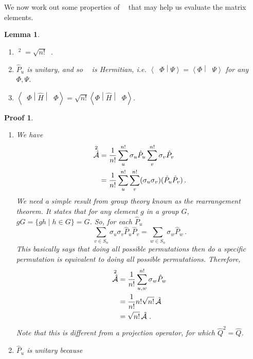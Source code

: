 \documentclass{article}
\theoremstyle{plain}\theoremheaderfont{\normalfont\itshape}\theorembodyfont{\rmfamily}\theoremseparator{.}\newtheorem*{rem}{Remark}\newtheorem*{ex}{Example}\newtheorem*{proof}{Proof}\newtheorem*{altp}{Alternative proof}
\theoremstyle{plain}\theoremheaderfont{\normalfont\bfseries}\theorembodyfont{\rmfamily}\theoremseparator{.}\newtheorem{thm}{Theorem}[section]\newtheorem{lem}[thm]{Lemma}\newtheorem{prop}[thm]{Proposition}\newtheorem*{cor}{Corollary}\newtheorem{defn}[thm]{Definition}\newtheorem{clm}[thm]{Claim}\newtheorem{clminproof}{Claim}
\theoremstyle{break}\theoremheaderfont{\normalfont\itshape}\theorembodyfont{\rmfamily}\theoremseparator{.\medskip}\newtheorem*{proofskip}{Proof}\newtheorem*{exs}{Examples}\newtheorem*{rems}{Remarks}
\theoremstyle{break}\theoremheaderfont{\normalfont\bfseries}\theorembodyfont{\rmfamily}\theoremseparator{.\medskip}\newtheorem{lemskip}[thm]{Lemma}\newtheorem{defnskip}[thm]{Definition}\newtheorem{propskip}[thm]{Proposition}\newtheorem{thmskip}[thm]{Theorem}
\numberwithin{equation}{section}
\newcommand{\braket}[2]{\left\langle #1 \middle| #2 \right\rangle}
\newcommand{\mel}[3]{\left\langle #1 \middle| #2 \middle| #3 \right\rangle}
\newcommand{\expval}[2]{\left\langle #2 \middle| #1 \middle| #2 \right\rangle}
\DeclareMathOperator{\antisymm}{\hat{\mathcal{A}}}
\begin{document}
    We now work out some properties of \(\antisymm\) that may help us evaluate the matrix elements.
    \begin{lemskip}
        \begin{enumerate}[topsep=0pt,label=(\roman*)]
            \item \(\antisymm^2=\sqrt{n!}\antisymm\).
            \item \(\hat{P}_u\) is unitary, and so \(\antisymm\) is Hermitian, i.e. \(\braket{\antisymm\Phi}{\Psi}=\braket{\Phi}{\antisymm\Psi}\) for any \(\Phi,\Psi\).
            \item \(\expval{\hat{H}}{\antisymm\Phi}=\sqrt{n!}\mel{\Phi}{\hat{H}}{\antisymm\Phi}\).
        \end{enumerate}
    \end{lemskip}
    \begin{proofskip}
        \begin{enumerate}[topsep=0pt,label=(\roman*)]
            \item We have
            \begin{align}
                \antisymm^2&=\frac{1}{n!}\sum_{u}^{n!}\sigma_u\hat{P}_u\sum_{v}^{n!}\sigma_v\hat{P}_v\notag\\
                &=\frac{1}{n!}\sum_{u}^{n!}\sum_{v}^{n!}(\sigma_u\sigma_v)(\hat{P}_u\hat{P}_v)\,.
            \end{align}
            We need a simple result from group theory known as the \textit{rearrangement theorem}. It states that for any element \(g\) in a group \(G\), \(gG=\{gh\mid h\in G\}=G\). So, for each \(\hat{P}_u\)
            \begin{equation}
                \sum_{v\in S_n}\sigma_u\sigma_v\hat{P}_u\hat{P}_v=\sum_{w\in S_n}\sigma_w\hat{P}_w\,.
            \end{equation}
            This basically says that doing all possible permutations then do a specific permutation is equivalent to doing all possible permutations. Therefore,
            \begin{align}
                \antisymm^2&=\frac{1}{n!}\sum_{u,w}^{n!}\sigma_w\hat{P}_w\notag\\
                &=\frac{1}{n!}n!\sqrt{n!}\antisymm\notag\\
                &=\sqrt{n!}\antisymm\,.
            \end{align}
            Note that this is different from a projection operator, for which \(\hat{Q}^2=\hat{Q}\).
            \item \(\hat{P}_u\) is unitary because

\end{enumerate}
\end{proofskip}
\end{document}
